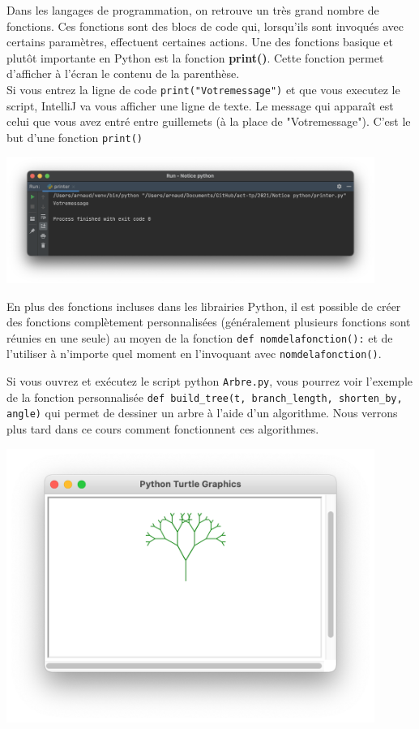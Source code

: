 Dans les langages de programmation, on retrouve un très grand nombre de fonctions. Ces fonctions sont des blocs de code qui, lorsqu'ils sont invoqués avec certains paramètres, effectuent certaines actions. Une des fonctions basique et plutôt importante en Python est la fonction \textbf{print()}.  Cette fonction permet d'afficher à l'écran le contenu de la parenthèse.\\ 
Si vous entrez la ligne de code \lstinline{print("Votremessage")} et que vous executez le script, IntelliJ va vous afficher une ligne de texte. Le message qui apparaît est celui que vous avez entré entre guillemets (à la place de "Votremessage"). C'est le but d'une fonction \lstinline{print()}
\begin{center}
\includegraphics[width=12cm]{print.png}	
\end{center}


En plus des fonctions incluses dans les librairies Python, il est possible de créer des fonctions complètement personnalisées (généralement plusieurs fonctions sont réunies en une seule) au moyen de la fonction \lstinline{def nomdelafonction():} et de l'utiliser à n'importe quel moment en l'invoquant avec \lstinline{nomdelafonction()}.

Si vous ouvrez et exécutez le script python \lstinline{Arbre.py}, vous pourrez voir l'exemple de la fonction personnalisée \lstinline{def build_tree(t, branch_length, shorten_by, angle)} qui permet de dessiner un arbre à l'aide d'un algorithme. Nous verrons plus tard dans ce cours comment fonctionnent ces algorithmes.

\begin{center}
\includegraphics[width=12cm]{arbre.png}		
\end{center}


